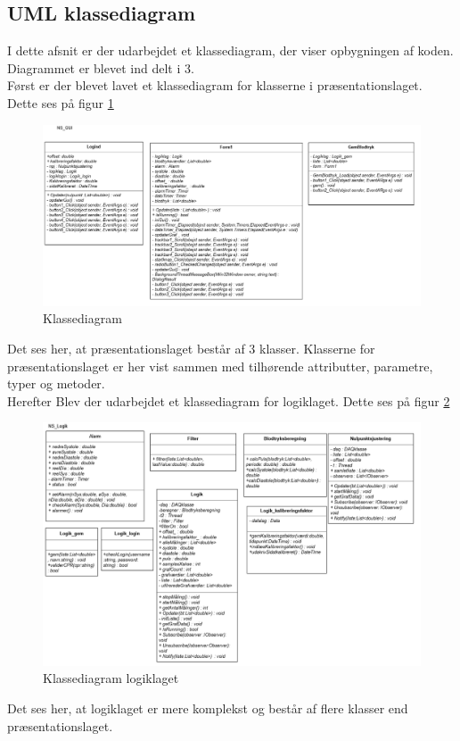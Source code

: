 \subsection{UML klassediagram}\label{UML klassediagram}
I dette afsnit er der udarbejdet et klassediagram, der viser opbygningen af koden. Diagrammet er blevet ind delt i 3.\\
Først er der blevet lavet et klassediagram for klasserne i præsentationslaget. Dette ses på figur \ref{klassediagrampres}
\begin{figure}[H]
	\includegraphics[width=1\textwidth]{Figurer/Softwareimplementering/UML-klassediagrampresentation}
	\caption{Klassediagram}
	\label{klassediagrampres}
\end{figure}
Det ses her, at præsentationslaget består af 3 klasser. Klasserne for præsentationslaget er her vist sammen med tilhørende attributter, parametre, typer og metoder. \\

Herefter Blev der udarbejdet et klassediagram for logiklaget. Dette ses på figur \ref{klassediagramlogik}
\begin{figure}[H]
	\includegraphics[width=1\textwidth]{Figurer/Softwareimplementering/UML-klassediagramlogik}
	\caption{Klassediagram logiklaget}
	\label{klassediagramlogik}
\end{figure}
Det ses her, at logiklaget er mere komplekst og består af flere klasser end præsentationslaget. \\

